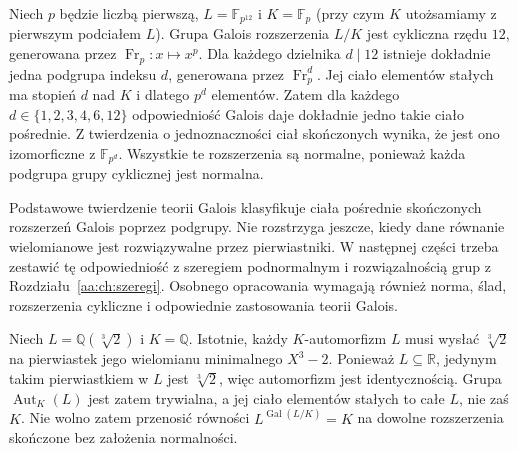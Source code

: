 \begin{przyklad}
\label{aa:prz:finite-fields-galois-lattice}
Niech $p$ będzie liczbą pierwszą,
$L=\mathbb F_{p^{12}}$ i $K=\mathbb F_p$
(przy czym $K$ utożsamiamy z pierwszym podciałem $L$).
Grupa Galois rozszerzenia $L/K$ jest cykliczna rzędu $12$, generowana
przez $\operatorname{Fr}_p:x\mapsto x^p$.
Dla każdego dzielnika $d\mid12$ istnieje dokładnie
jedna podgrupa indeksu $d$, generowana przez
$\operatorname{Fr}_p^{d}$. Jej ciało elementów stałych
ma stopień $d$ nad $K$ i dlatego $p^d$ elementów.
Zatem dla każdego $d\in\{1,2,3,4,6,12\}$
odpowiedniość Galois daje dokładnie jedno takie
ciało pośrednie. Z twierdzenia o jednoznaczności ciał
skończonych wynika, że jest ono izomorficzne z
$\mathbb F_{p^d}$.
Wszystkie te rozszerzenia są normalne, ponieważ
każda podgrupa grupy cyklicznej jest normalna.
\end{przyklad}

\begin{uwaga}
\label{aa:uw:galois-future}
Podstawowe twierdzenie teorii Galois klasyfikuje ciała
pośrednie skończonych rozszerzeń Galois poprzez podgrupy.
Nie rozstrzyga jeszcze, kiedy dane równanie wielomianowe
jest rozwiązywalne przez pierwiastniki. W następnej części
trzeba zestawić tę odpowiedniość z szeregiem podnormalnym
i rozwiązalnością grup z Rozdziału~\ref{aa:ch:szeregi}.
Osobnego opracowania wymagają również norma, ślad,
rozszerzenia cykliczne i odpowiednie zastosowania teorii Galois.
\end{uwaga}

\begin{uwaga}
Niech $L=\mathbb Q(\sqrt[3]{2})$ i $K=\mathbb Q$.
Istotnie, każdy $K$-automorfizm $L$ musi wysłać
$\sqrt[3]{2}$ na pierwiastek jego wielomianu minimalnego
$X^3-2$. Ponieważ $L\subseteq\mathbb R$, jedynym takim
pierwiastkiem w $L$ jest $\sqrt[3]{2}$, więc automorfizm
jest identycznością. Grupa $\operatorname{Aut}_K(L)$
jest zatem trywialna, a jej ciało elementów stałych
to całe $L$, nie zaś $K$.
Nie wolno zatem przenosić równości
$L^{\operatorname{Gal}(L/K)}=K$ na dowolne rozszerzenia
skończone bez założenia normalności.
\end{uwaga}
